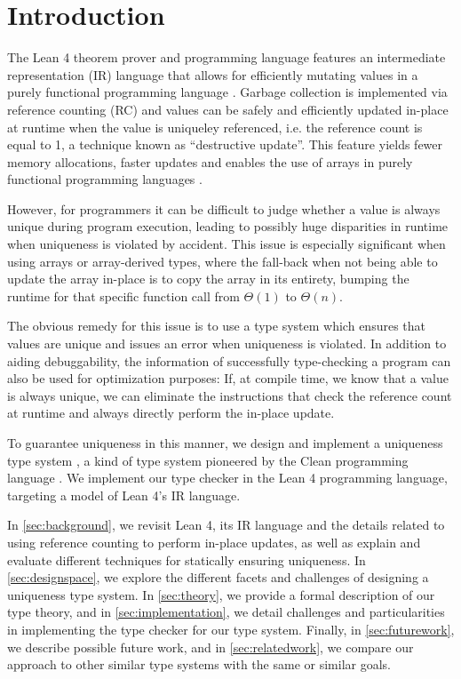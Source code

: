 \chapter{Introduction}\label{sec:intro}

The Lean 4 theorem prover and programming language \citep{de_moura_lean_2021} features an intermediate representation (IR) language that allows for efficiently mutating values in a purely functional programming language \citep{ullrich_counting_2020}. Garbage collection is implemented via reference counting (RC) and values can be safely and efficiently updated in-place at runtime when the value is uniqueley referenced, i.e. the reference count is equal to 1, a technique known as ``destructive update''. This feature yields fewer memory allocations, faster updates and enables the use of arrays in purely functional programming languages \citep{ullrich_counting_2020}.

However, for programmers it can be difficult to judge whether a value is always unique during program execution, leading to possibly huge disparities in runtime when uniqueness is violated by accident. This issue is especially significant when using arrays or array-derived types, where the fall-back when not being able to update the array in-place is to copy the array in its entirety, bumping the runtime for that specific function call from $\Theta(1)$ to $\Theta(n)$.

The obvious remedy for this issue is to use a type system which ensures that values are unique and issues an error when uniqueness is violated. In addition to aiding debuggability, the information of successfully type-checking a program can also be used for optimization purposes: If, at compile time, we know that a value is always unique, we can eliminate the instructions that check the reference count at runtime and always directly perform the in-place update.

To guarantee uniqueness in this manner, we design and implement a uniqueness type system \citep{sergey_linearity_2022}, a kind of type system pioneered by the Clean programming language \citep{smetsers_guaranteeing_1994}. We implement our type checker in the Lean 4 programming language, targeting a model of Lean 4's IR language.

In \cref{sec:background}, we revisit Lean 4, its IR language and the details related to using reference counting to perform in-place updates, as well as explain and evaluate different techniques for statically ensuring uniqueness. In \cref{sec:designspace}, we explore the different facets and challenges of designing a uniqueness type system. In \cref{sec:theory}, we provide a formal description of our type theory, and in \cref{sec:implementation}, we detail challenges and particularities in implementing the type checker for our type system. Finally, in \cref{sec:futurework}, we describe possible future work, and in \cref{sec:relatedwork}, we compare our approach to other similar type systems with the same or similar goals.